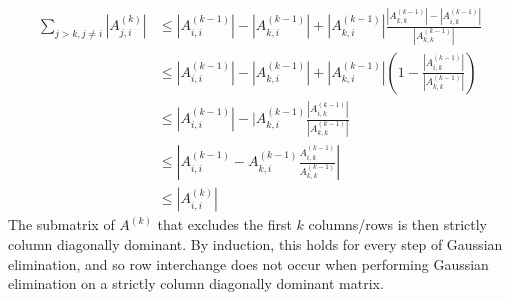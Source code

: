 \documentclass{article}
\begin{document}
\begin{align*}
    \sum_{j > k, j \neq i} |A^{(k)}_{j,i}| & \leq |A^{(k - 1)}_{i,i}| - |A^{(k - 1)}_{k,i}| + |A^{(k-1)}_{k,i}| \frac{|A^{(k-1)}_{k,k}| - |A^{(k-1)}_{i,k}|}{|A^{(k-1)}_{k,k}|} \\
    & \leq |A^{(k - 1)}_{i,i}| - |A^{(k - 1)}_{k,i}| + |A^{(k-1)}_{k,i}|\left(1 - \frac{|A^{(k-1)}_{i,k}|}{|A^{(k-1)}_{k,k}|}\right) \\
    & \leq |A^{(k - 1)}_{i,i}| - |A^{(k-1)}_{k,i}\frac{|A^{(k-1)}_{i,k}|}{|A^{(k-1)}_{k,k}|} \\
    & \leq \left|A^{(k - 1)}_{i,i} - A^{(k-1)}_{k,i}\frac{A^{(k-1)}_{i,k}}{A^{(k-1)}_{k,k}}\right| \\
    & \leq |A^{(k)}_{i,i}|
\end{align*}
The submatrix of $A^{(k)}$ that excludes the first $k$ columns/rows is then strictly column diagonally dominant. By induction, this holds for every step of Gaussian elimination, and so row interchange does not occur when performing Gaussian elimination on a strictly column diagonally dominant matrix.
\end{document}
